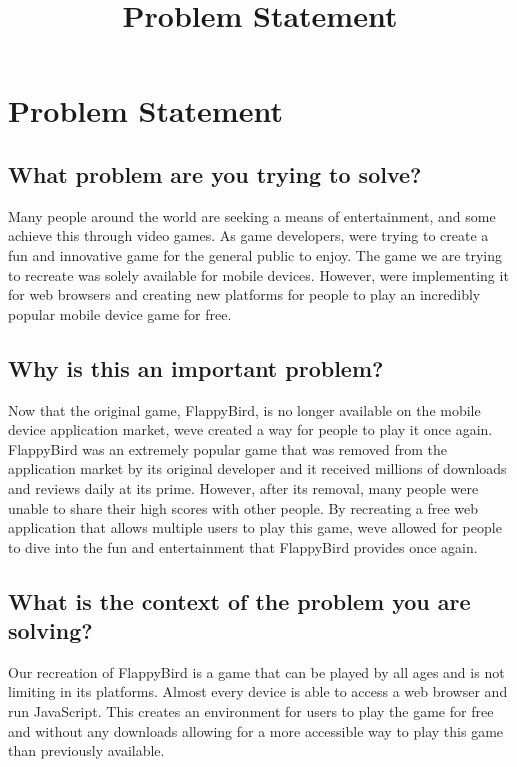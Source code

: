 \documentclass[11pt, oneside]{article}   	%
\title{Problem Statement}
\author{}
\begin{document}
\marginpar{}
\section*{Problem Statement}
\subsection*{What problem are you trying to solve?}

\newcommand*\apos{\textsc{\char13}}
Many people around the world are seeking a means of entertainment, and some achieve this through video games. As game developers, we\apos re trying to create a fun and innovative game for the general public to enjoy. The game we are trying to recreate was solely available for mobile devices. However, we\apos re implementing it for web browsers and creating new platforms for people to play an incredibly popular mobile device game for free.

\subsection*{Why is this an important problem?}

Now that the original game, FlappyBird, is no longer available on the mobile device application market, we\apos ve created a way for people to play it once again. FlappyBird was an extremely popular game that was removed from the application market by its original developer and it received millions of downloads and reviews daily at its prime. However, after its removal, many people were unable to share their high scores with other people. By recreating a free web application that allows multiple users to play this game, we\apos ve allowed for people to dive into the fun and entertainment that FlappyBird provides once again. 

\subsection*{What is the context of the problem you are solving?}

Our recreation of FlappyBird is a game that can be played by all ages and is not limiting in its platforms. Almost every device is able to access a web browser and run JavaScript. This creates an environment for users to play the game for free and without any downloads allowing for a more accessible way to play this game than previously available.
\end{document}
